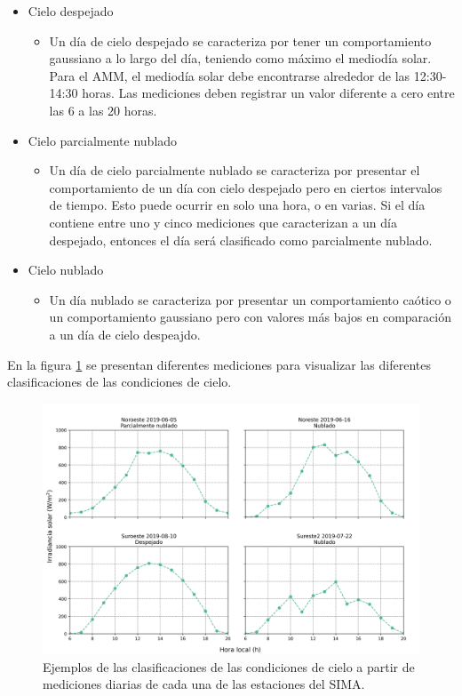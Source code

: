 \begin{itemize}
	\item Cielo despejado
	      \begin{itemize}
		      \item Un día de cielo despejado se caracteriza por tener un comportamiento gaussiano a lo largo del día, teniendo como máximo el mediodía solar. Para el AMM, el mediodía solar debe encontrarse alrededor de las 12:30-14:30 horas. Las mediciones deben registrar un valor diferente a cero entre las 6 a las 20 horas.
	      \end{itemize}
	\item Cielo parcialmente nublado
	      \begin{itemize}
		      \item Un día de cielo parcialmente nublado se caracteriza por presentar el comportamiento de un día con cielo despejado pero en ciertos intervalos de tiempo. Esto puede ocurrir en solo una hora, o en varias. Si el día contiene entre uno y cinco mediciones que caracterizan a un día despejado, entonces el día será clasificado como parcialmente nublado.
	      \end{itemize}
	\item Cielo nublado
	      \begin{itemize}
		      \item Un día nublado se caracteriza por presentar un comportamiento caótico o un comportamiento gaussiano pero con valores más bajos en comparación a un día de cielo despeajdo.
	      \end{itemize}
\end{itemize}

En la figura \ref{fig:example_sky_conditions} se presentan diferentes mediciones para visualizar las diferentes clasificaciones de las condiciones de cielo.

\begin{figure}[H]
	\centering
	\includegraphics[width=15cm]{Graphics/example_sky_conditions.png}
	\caption{Ejemplos de las clasificaciones de las condiciones de cielo a partir de mediciones diarias de cada una de las estaciones del SIMA.}
	\label{fig:example_sky_conditions}
\end{figure}

